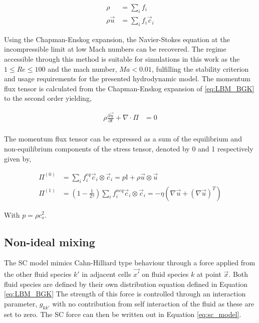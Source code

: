 \begin{equation}
    \begin{split}
        \rho &= \sum_i f_i \\
        \rho\vec{u} &= \sum_i f_i \vec{c}_i
    \end{split}
\end{equation}

Using the Chapman-Enskog expansion, the Navier-Stokes equation at the incompressible limit at low Mach
numbers can be recovered. \cite{qian_lattice_1992, he_lattice_1997} The regime accessible through this method is suitable 
for simulations in this work as the $ 1 \leq Re \leq 100 $ and the mach number, $Ma < 0.01$, fulfilling the stability 
criterion and usage requirements for the presented hydrodynamic model.
The momentum flux tensor is calculated from the Chapman-Enskog expansion of \ref{eq:LBM_BGK} to the second order yielding,

\begin{equation}
    \begin{split}
        \rho\frac{\partial \vec{u}}{\partial t} + \nabla \cdot \Pi &= 0 \\
    \end{split}
\end{equation}

The momentum flux tensor can be expressed as a sum of the equilibrium and non-equilibrium components of the stress tensor, denoted by 0 and 1 respectively given by,

\begin{equation}
    \begin{split}
        \Pi^{(0)} &= \sum_i f_i^{eq} \vec{c}_i \otimes \vec{c}_i = p\mathbb{I} + \rho \vec{u} \otimes \vec{u} \\
        \Pi^{(1)} &= (1 - \frac{1}{2 \tau})\sum_i f_i^{neq} \vec{c}_i \otimes \vec{c}_i = -\eta (\nabla \vec{u} + (\nabla \vec{u})^T)
    \end{split}
\end{equation}

With $p = \rho c_s^2$.

\subsection{Non-ideal mixing}
\label{section:lbm_non_ideal_mixing}

The SC model mimics Cahn-Hilliard type behaviour through a force applied from the other fluid species $k'$ in adjacent 
cells $\vec{x'}$ on fluid species $k$ at point $\vec{x}$. \cite{shan_lattice_1993, shan_simulation_1994, 
shan_multicomponent_1995, he_discrete_1998, jansen_bijels_2011, chin_lattice_2002} Both fluid species are defined
by their own distribution equation defined in Equation \ref{eq:LBM_BGK} The strength of this force is controlled 
through an interaction parameter, $g_{kk'}$ with no contribution from self interaction of the fluid as these are 
set to zero. The SC force can then be written out in Equation \ref{eq:sc_model}.

